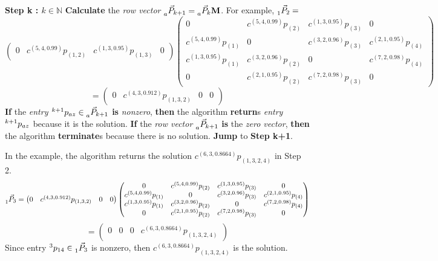 \documentclass[12pt]{amsart}
\theoremstyle{definition}
\theoremstyle{remark}
\numberwithin{equation}{section}
\newcommand{\N}{\mathbb{N}}
\newcommand{\step}[1]{\noindent\textbf{Step #1}}
\begin{document}
\step{k : $k \in \N$} \textbf{Calculate} the \textit{row vector $\prescript{}{a}{\vec{P}_{k+1}} = \prescript{}{a}{\vec{P}_k} \mathbf{M}$}. For example, $\prescript{}{1}{\vec{P}_{2}} = $
$$
\begin{pmatrix} 0 & c^{(5,4,0.99)} p_{(1,2)} & c^{(1,3,0.95)} p_{(1,3)} & 0 \end{pmatrix}
\begin{pmatrix}
0 & c^{(5,4,0.99)} p_{(2)} & c^{(1,3,0.95)} p_{(3)} & 0 \\
c^{(5,4,0.99)} p_{(1)} & 0 & c^{(3,2,0.96)} p_{(3)} & c^{(2,1,0.95)} p_{(4)} \\
c^{(1,3,0.95)} p_{(1)} & c^{(3,2,0.96)} p_{(2)} & 0 & c^{(7,2,0.98)} p_{(4)} \\
0 & c^{(2,1,0.95)} p_{(2)} & c^{(7,2,0.98)} p_{(3)} & 0 \end{pmatrix}
$$
$$
= \begin{pmatrix} 0 & c^{(4,3,0.912)} p_{(1,3,2)} & 0 & 0 \end{pmatrix}
$$
\textbf{If} the \textit{entry $\prescript{k+1}{}{p_{az}} \in \prescript{}{a}{\vec{P}_{k+1}}$} \textbf{is} \textit{nonzero}, \textbf{then} the algorithm \textbf{return}s \textit{entry $\prescript{k+1}{}{p_{az}}$} because it is the solution. \textbf{If} the \textit{row vector $\prescript{}{a}{\vec{P}_{k+1}}$} \textbf{is} the \textit{zero vector}, \textbf{then} the algorithm \textbf{terminate}s because there is no solution. \textbf{Jump} to \step{k+1}.

\hspace{1cm}

\noindent In the example, the algorithm returns the solution $c^{(6,3,0.8664)} p_{(1,3,2,4)}$ in Step 2.
$$
\prescript{}{1}{\vec{P}_{3}} = \begin{pmatrix} 0 & c^{(4,3,0.912)} p_{(1,3,2)} & 0 & 0 \end{pmatrix}
\begin{pmatrix}
0 & c^{(5,4,0.99)} p_{(2)} & c^{(1,3,0.95)} p_{(3)} & 0 \\
c^{(5,4,0.99)} p_{(1)} & 0 & c^{(3,2,0.96)} p_{(3)} & c^{(2,1,0.95)} p_{(4)} \\
c^{(1,3,0.95)} p_{(1)} & c^{(3,2,0.96)} p_{(2)} & 0 & c^{(7,2,0.98)} p_{(4)} \\
0 & c^{(2,1,0.95)} p_{(2)} & c^{(7,2,0.98)} p_{(3)} & 0 \end{pmatrix}
$$
$$
= \begin{pmatrix} 0 & 0 & 0 & c^{(6,3,0.8664)} p_{(1,3,2,4)} \end{pmatrix}
$$
Since entry $\prescript{3}{}{p_{14}} \in \prescript{}{1}{\vec{P}_{3}}$ is nonzero, then $c^{(6,3,0.8664)} p_{(1,3,2,4)}$ is the solution.
\end{document}
